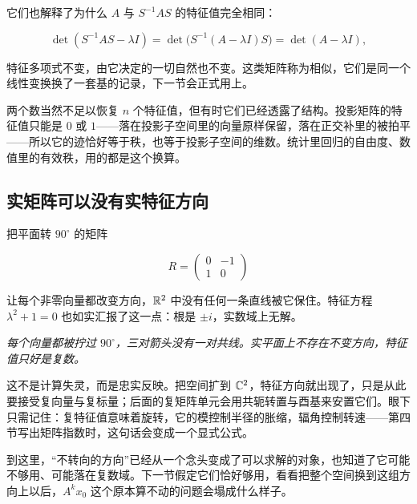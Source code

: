 它们也解释了为什么 \(A\) 与 \(S^{-1}AS\) 的特征值完全相同：

\[
\det(S^{-1}AS-\lambda I)=\det\bigl(S^{-1}(A-\lambda I)S\bigr)=\det(A-\lambda I),
\]

特征多项式不变，由它决定的一切自然也不变。这类矩阵称为相似，它们是同一个线性变换换了一套基的记录，下一节会正式用上。

两个数当然不足以恢复 \(n\) 个特征值，但有时它们已经透露了结构。投影矩阵的特征值只能是 \(0\) 或 \(1\)——落在投影子空间里的向量原样保留，落在正交补里的被拍平——所以它的迹恰好等于秩，也等于投影子空间的维数。统计里回归的自由度、数值里的有效秩，用的都是这个换算。

\subsection{实矩阵可以没有实特征方向}

把平面转 \(90^\circ\) 的矩阵

\[
R=\begin{pmatrix}0&-1\\1&0\end{pmatrix}
\]

让每个非零向量都改变方向，\(\mathbb{R}^2\) 中没有任何一条直线被它保住。特征方程 \(\lambda^2+1=0\) 也如实汇报了这一点：根是 \(\pm i\)，实数域上无解。

\begin{center}

\emph{每个向量都被拧过 \(90^\circ\)，三对箭头没有一对共线。实平面上不存在不变方向，特征值只好是复数。}
\end{center}

这不是计算失灵，而是忠实反映。把空间扩到 \(\mathbb{C}^2\)，特征方向就出现了，只是从此要接受复向量与复标量；后面的复矩阵单元会用共轭转置与酉基来安置它们。眼下只需记住：复特征值意味着旋转，它的模控制半径的胀缩，辐角控制转速——第四节写出矩阵指数时，这句话会变成一个显式公式。

到这里，``不转向的方向''已经从一个念头变成了可以求解的对象，也知道了它可能不够用、可能落在复数域。下一节假定它们恰好够用，看看把整个空间换到这组方向上以后，\(A^k x_0\) 这个原本算不动的问题会塌成什么样子。
